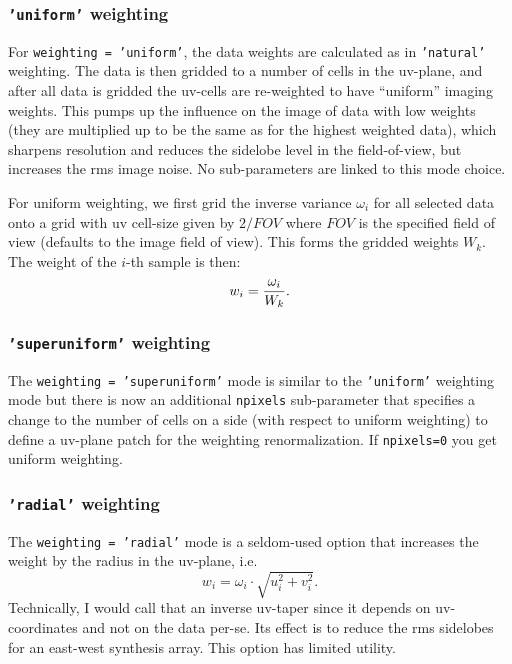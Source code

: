 \subsubsection{{\tt 'uniform'} weighting }
\label{section:im.pars.weighting.uniform}

For {\tt weighting = 'uniform'}, the data weights are calculated
as in {\tt 'natural'} weighting.  The data is then gridded to
a number of cells in the uv-plane, and after all data is gridded
the uv-cells are re-weighted to have ``uniform'' imaging weights.
This pumps
up the influence on the image of data with low weights (they are
multiplied up to be the same as for the highest weighted data), which
sharpens resolution and reduces the sidelobe level in the
field-of-view, but increases the rms image noise. No sub-parameters are
linked to this mode choice.

For uniform weighting, we first grid the inverse variance $\omega_i$
for all selected data onto a grid with uv cell-size given by $2/FOV$
where $FOV$ is the specified field of view (defaults to the image
field of view).  This forms the gridded weights $W_k$. The weight of
the $i$-th sample is then: 
\begin{equation}
  w_i = {\omega_i \over W_k}.
\end{equation}

\subsubsection{{\tt 'superuniform'} weighting }
\label{section:im.pars.weighting.superuniform}

The {\tt weighting = 'superuniform'} mode is similar to the
{\tt 'uniform'} weighting mode but there is now an additional
{\tt npixels} sub-parameter that specifies a change to the number of 
cells on a side (with respect to uniform weighting) to define a
uv-plane patch for the weighting renormalization.  
If {\tt npixels=0} you get uniform weighting.

\subsubsection{{\tt 'radial'} weighting }
\label{section:im.pars.weighting.radial}

The {\tt weighting = 'radial'} mode is a seldom-used option that
increases the weight by the radius in the uv-plane, i.e.
\begin{equation}
  w_i = \omega_i \cdot \sqrt{u^2_i + v^2_i}.
\end{equation}
Technically, I would call that an inverse uv-taper since it depends on
uv-coordinates and not on the data per-se.
Its effect is to reduce the rms sidelobes for an east-west synthesis
array.  This option has limited utility.

